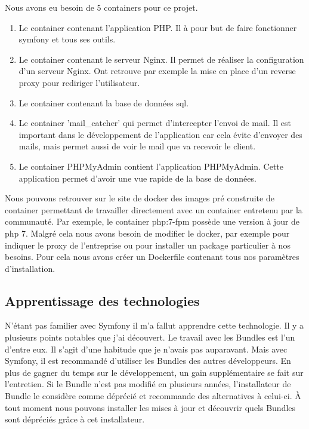 \documentclass[12pt, twoside, openright]{report}
\begin{document}
Nous avons eu besoin de 5 containers pour ce projet.
\begin{enumerate}
\item Le container contenant l'application PHP. Il à pour but de faire fonctionner symfony et tous ses outils.
\item Le container contenant le serveur Nginx. Il permet de réaliser la configuration d'un serveur Nginx. Ont retrouve par exemple la mise en place d'un reverse proxy pour rediriger l'utilisateur.
\item Le container contenant la base de données sql.
\item Le container 'mail\_catcher' qui permet d'intercepter l'envoi de mail. Il est important dans le développement de l'application car cela évite d'envoyer des mails, mais permet aussi de voir le mail que va recevoir le client.
\item Le container PHPMyAdmin contient l'application PHPMyAdmin. Cette application permet d'avoir une vue rapide de la base de données.
\end{enumerate}

Nous pouvons retrouver sur le site de docker des images pré construite de container permettant de travailler directement avec un container entretenu par la communauté. Par exemple, le container php:7-fpm possède une version à jour de php 7. Malgré cela nous avons besoin de modifier le docker, par exemple pour indiquer le proxy de l'entreprise ou pour installer un package particulier à nos besoins. Pour cela nous avons créer un Dockerfile contenant tous nos paramètres d'installation. 

\subsection{Apprentissage des technologies}
N'étant pas familier avec Symfony il m'a fallut apprendre cette technologie. Il y a plusieurs points notables que j'ai découvert. Le travail avec les Bundles est l'un d'entre eux. Il s'agit d'une habitude que je n'avais pas auparavant. Mais avec Symfony, il est recommandé d'utiliser les Bundles des autres développeurs. En plus de gagner du temps sur le développement, un gain supplémentaire se fait sur l'entretien. Si le Bundle n'est pas modifié en plusieurs années, l'installateur de Bundle le considère comme déprécié et recommande des alternatives à celui-ci. À tout moment nous pouvons installer les mises à jour et découvrir quels Bundles sont dépréciés grâce à cet installateur.
\end{document}

